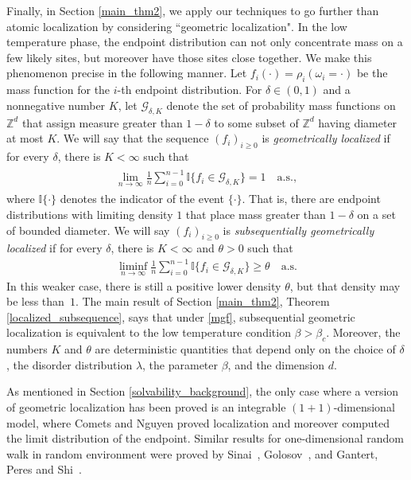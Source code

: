 \documentclass[11pt,reqno]{amsart}
\numberwithin{equation}{section}
\theoremstyle{definition}
\begin{document}
Finally, in Section \ref{main_thm2}, we apply our techniques to go further than atomic localization by considering ``geometric localization".
In the low temperature phase, the endpoint distribution can not only concentrate mass on a few likely sites, but moreover have those sites close together.
We make this phenomenon precise in the following manner.
Let $f_i(\cdot) = \rho_i(\omega_i = \cdot)$ be the mass function for the $i$-th endpoint distribution.
For $\delta \in (0,1)$ and a nonnegative number $K$, let ${\mathcal{G}}_{\delta,K}$ denote the set of probability mass functions on ${\mathbb{Z}}^d$ that assign measure greater than $1-\delta$ to some subset of ${\mathbb{Z}}^d$ having diameter at most $K$.
We will say that the sequence $(f_i)_{i \geq 0}$ is \textit{geometrically localized} if for every $\delta$, there is $K< \infty$ such that
{\begin{align} \begin{split} {
\lim_{n \to \infty} \frac{1}{n} \sum_{i = 0}^{n-1} {\mathbb{I}}\{f_i \in {\mathcal{G}}_{\delta,K}\} = 1 \quad \mathrm{a.s.}, \label{geometric_localization}
} \end{split} \end{align}}
where ${\mathbb{I}}\{\cdot\}$ denotes the indicator of the event $\{\cdot \}$.
That is, there are endpoint distributions with limiting density $1$ that place mass greater than $1 - \delta$ on a set of bounded diameter.
We will say $(f_i)_{i \geq 0}$ is \textit{subsequentially geometrically localized} if for every $\delta$, there is $K < \infty$ and $\theta > 0$ such that
{\begin{align*} {
\liminf_{n \to \infty} \frac{1}{n} \sum_{i = 0}^{n-1} {\mathbb{I}}\{f_i\in {\mathcal{G}}_{\delta,K}\} \geq \theta \quad \mathrm{a.s.}
} \end{align*}}
In this weaker case, there is still a positive lower density $\theta$, but that density may be less than~$1$. The main result of Section \ref{main_thm2}, Theorem \ref{localized_subsequence}, says that under \eqref{mgf},  subsequential geometric localization is equivalent to the low temperature condition $\beta > \beta_c$. Moreover, the numbers $K$ and $\theta$ are deterministic quantities that depend only on the choice of $\delta$, the disorder distribution $\lambda$, the parameter $\beta$, and the dimension $d$.

As mentioned in Section \ref{solvability_background}, the only case where a version of geometric localization has been proved is an integrable $(1+1)$-dimensional model, where Comets and Nguyen \cite{comets-nguyen15} proved localization and moreover computed the limit distribution of the endpoint. Similar results for one-dimensional random walk in random environment were proved by Sinai~\cite{sinai82}, Golosov~\cite{golosov84}, and Gantert, Peres and Shi~\cite{gantert-peres-shi10}.
\end{document}
